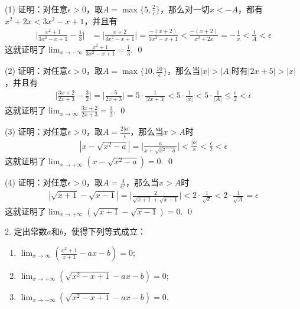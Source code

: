 (1) 证明：对任意$\epsilon > 0$，取$A = \max \{ 5, \displaystyle\frac{2}{\epsilon} \}$，那么对一切$x < -A$，都有$x^2+2x<3x^2-x+1$，并且有
\begin{align} 
    \bigg\lvert \displaystyle\frac{x^2+1}{3x^2-x+1} - \displaystyle\frac{1}{3} \bigg\rvert &= \bigg\lvert \displaystyle\frac{x+2}{3x^2-x+1} \bigg\rvert = \displaystyle\frac{-(x+2)}{3x^2-x+1} < \displaystyle\frac{-(x+2)}{x^2+2x} = -\displaystyle\frac{1}{x} < \frac{1}{A} < \epsilon
\end{align}
这就证明了$\displaystyle\lim_{x \to -\infty} \displaystyle\frac{x^2+1}{3x^2-x+1}=\displaystyle\frac{1}{3}$. \qed

(2) 证明：对任意$\epsilon > 0$，取$A = \max \{10, \displaystyle\frac{10}{\epsilon} \}$，那么当$|x| > |A|$时有$|2x+5|>|x|$，并且有
\begin{align}
    \bigg\lvert \displaystyle\frac{3x+2}{2x+3} - \displaystyle\frac{3}{2} \bigg\rvert = \bigg\lvert \displaystyle \frac{-5}{2x+3} \bigg\rvert = 5 \cdot \displaystyle\frac{1}{|2x+3|} < 5 \cdot \displaystyle\frac{1}{|x|} < 5 \cdot \displaystyle\frac{1}{|A|} \leq \displaystyle\frac{\epsilon}{2} < \epsilon
\end{align}
这就证明了$\displaystyle\lim_{x \to \infty} \displaystyle\frac{3x+2}{2x+3} = \displaystyle\frac{3}{2}$. \qed

(3) 证明：对任意$\epsilon > 0$，取$A = \displaystyle\frac{2|a|}{\epsilon}$，那么当$x > A$时
\begin{align}
    |x-\sqrt{x^2-a}|=\bigg\lvert \displaystyle\frac{a}{x+\sqrt{x^2-a}} \bigg\rvert < \displaystyle\frac{|a|}{x} < \displaystyle\frac{\epsilon}{2} < \epsilon
\end{align}
这就证明了$\displaystyle\lim_{x \to +\infty}(x-\sqrt{x^2-a})=0$. \qed

(4) 证明：对任意$\epsilon > 0$，取$A=\displaystyle\frac{4}{\epsilon^2}$，那么当$x > A$时
\begin{align}
    | \sqrt{x+1}-\sqrt{x-1} | = \bigg\lvert \displaystyle\frac{2}{\sqrt{x+1}+\sqrt{x-1}} \bigg\rvert < 2 \cdot \displaystyle\frac{1}{\sqrt{x}} < 2 \cdot \displaystyle\frac{1}{\sqrt{A}} = \epsilon
\end{align}
这就证明了$\displaystyle\lim_{x \to +\infty} (\sqrt{x+1}-\sqrt{x-1})=0$. \qed

2. 定出常数$a$和$b$，使得下列等式成立：
\begin{enumerate}
    \item $\displaystyle\lim_{x\to\infty}\left(\displaystyle\frac{x^2+1}{x+1}-ax-b\right)=0$; 
    \item $\displaystyle\lim_{x\to +\infty}\left(\sqrt{x^2-x+1}-ax-b\right)=0$;
    \item $\displaystyle\lim_{x\to -\infty}\left(\sqrt{x^2-x+1}-ax-b\right)=0$.
\end{enumerate}

